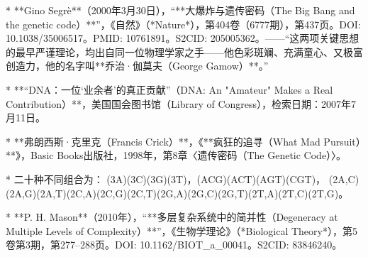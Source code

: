 \begin{enumerate}
* **Gino Segrè**（2000年3月30日），“**大爆炸与遗传密码（The Big Bang and the genetic code）**”，《自然》（*Nature*），第404卷（6777期），第437页。DOI: 10.1038/35006517。PMID: 10761891。S2CID: 205005362。——“这两项关键思想的最早严谨理论，均出自同一位物理学家之手——他色彩斑斓、充满童心、又极富创造力，他的名字叫**乔治·伽莫夫（George Gamow）**。”

* **“DNA：一位‘业余者’的真正贡献”（DNA: An "Amateur" Makes a Real Contribution）**，美国国会图书馆（Library of Congress），检索日期：2007年7月11日。

* **弗朗西斯·克里克（Francis Crick）**，《**疯狂的追寻（What Mad Pursuit）**》，Basic Books出版社，1998年，第8章〈遗传密码（The Genetic Code）〉。

* 二十种不同组合为：
  (3A)(3C)(3G)(3T)，(ACG)(ACT)(AGT)(CGT)，
  (2A,C)(2A,G)(2A,T)(2C,A)(2C,G)(2C,T)(2G,A)(2G,C)(2G,T)(2T,A)(2T,C)(2T,G)。

* **P. H. Mason**（2010年），“**多层复杂系统中的简并性（Degeneracy at Multiple Levels of Complexity）**”，《生物学理论》（*Biological Theory*），第5卷第3期，第277–288页。DOI: 10.1162/BIOT_a_00041。S2CID: 83846240。

\end{enumerate}
